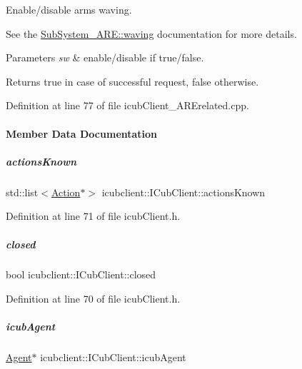 Enable/disable arms waving. 

See the \hyperlink{group__icubclient__subsystems_a12374067510db0ffcd01bbea4e7b0ce1}{Sub\+System\+\_\+\+A\+R\+E\+::waving} documentation for more details. 
\begin{DoxyParams}{Parameters}
{\em sw} & enable/disable if true/false. \\
\hline
\end{DoxyParams}
\begin{DoxyReturn}{Returns}
true in case of successful request, false otherwise. 
\end{DoxyReturn}


Definition at line 77 of file icub\+Client\+\_\+\+A\+R\+Erelated.\+cpp.



\paragraph{Member Data Documentation}
\mbox{\label{group__icubclient__clients_a93d0abd1eaf1006e53e6a3cec00a7297}} 
\subparagraph{\texorpdfstring{actions\+Known}{actionsKnown}}
{\footnotesize\ttfamily std\+::list$<$\hyperlink{group__icubclient__representations_classicubclient_1_1Action}{Action}$\ast$$>$ icubclient\+::\+I\+Cub\+Client\+::actions\+Known\hspace{0.3cm}{\ttfamily [protected]}}



Definition at line 71 of file icub\+Client.\+h.

\mbox{\label{group__icubclient__clients_a08b2e9fb2884b6c42c872bfafecea4f1}} 
\subparagraph{\texorpdfstring{closed}{closed}}
{\footnotesize\ttfamily bool icubclient\+::\+I\+Cub\+Client\+::closed\hspace{0.3cm}{\ttfamily [protected]}}



Definition at line 70 of file icub\+Client.\+h.

\mbox{\label{group__icubclient__clients_a331f874d5382777bb167d42bf10e8014}} 
\subparagraph{\texorpdfstring{icub\+Agent}{icubAgent}}
{\footnotesize\ttfamily \hyperlink{group__icubclient__representations_classicubclient_1_1Agent}{Agent}$\ast$ icubclient\+::\+I\+Cub\+Client\+::icub\+Agent}



